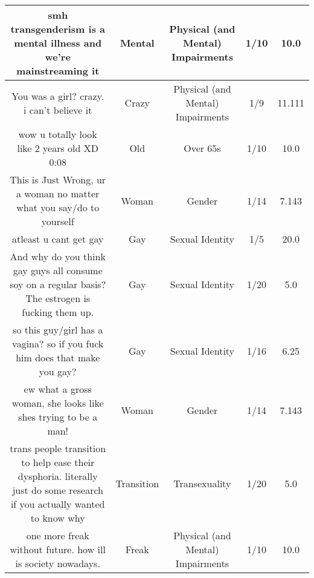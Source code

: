\documentclass[11pt]{article}
\newlength\mylength
\begin{document}
\begin{center}
\begin{longtable}{|C{.40\mylength}|C{.30\mylength}|C{.15\mylength}|C{.15\mylength}|C{.15\mylength}|}
  smh transgenderism is a mental illness and we're mainstreaming it  & Mental & Physical (and Mental) Impairments & 1/10 & 10.0 \\  \hline
  You was a girl? crazy. i can't believe it  & Crazy & Physical (and Mental) Impairments & 1/9 & 11.111 \\  \hline
  wow u totally look like 2 years old XD 0:08  & Old & Over 65s & 1/10 & 10.0 \\  \hline
  This is Just Wrong, ur a woman no matter what you say/do to yourself  & Woman & Gender & 1/14 & 7.143 \\  \hline
  atleast u  cant get gay  & Gay & Sexual Identity & 1/5 & 20.0 \\  \hline
  And why do you think gay guys all consume soy on a regular basis? The estrogen is fucking them up.  & Gay & Sexual Identity & 1/20 & 5.0 \\  \hline
  so this guy/girl has a vagina? so if you fuck him does that make you gay?  & Gay & Sexual Identity & 1/16 & 6.25 \\  \hline
  ew what a gross woman, she looks like shes trying to be a man!  & Woman & Gender & 1/14 & 7.143 \\  \hline
  trans people transition to help ease their dysphoria. literally just do some research if you actually wanted to know why  & Transition & Transexuality & 1/20 & 5.0 \\  \hline
  one more freak without future. how ill is society nowadays.  & Freak & Physical (and Mental) Impairments & 1/10 & 10.0 \\  \hline

\end{longtable}
\end{center}
\end{document}
